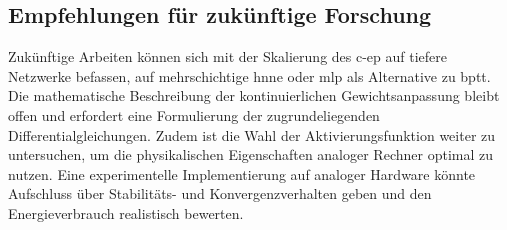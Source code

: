\subsection{Empfehlungen für zukünftige Forschung}

Zukünftige Arbeiten können sich mit der Skalierung des \ac{c-ep} auf tiefere Netzwerke befassen, \zb auf mehrschichtige \ac{hnn}e oder \ac{mlp} als Alternative zu \ac{bptt}. Die mathematische Beschreibung der kontinuierlichen Gewichtsanpassung bleibt offen und erfordert eine Formulierung der zugrundeliegenden Differentialgleichungen. Zudem ist die Wahl der Aktivierungsfunktion weiter zu untersuchen, um die physikalischen Eigenschaften analoger Rechner optimal zu nutzen. Eine experimentelle Implementierung auf analoger Hardware könnte Aufschluss über Stabilitäts- und Konvergenzverhalten geben und den Energieverbrauch realistisch bewerten.
